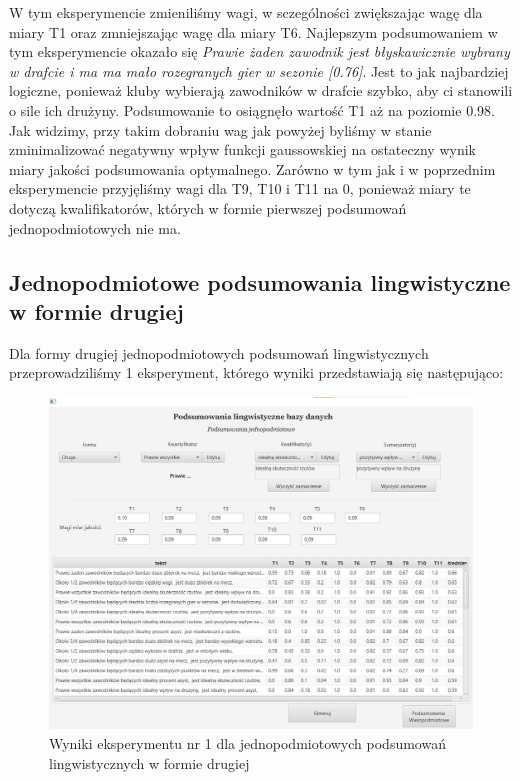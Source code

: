 \documentclass{classrep}
\begin{document}
W tym eksperymencie zmieniliśmy wagi, w sczególności zwiększając wagę dla miary T1 oraz zmniejszając wagę dla miary T6. Najlepszym podsumowaniem w tym eksperymencie okazało się \textit{Prawie żaden zawodnik jest błyskawicznie wybrany w drafcie i ma ma mało rozegranych gier w sezonie [0.76]}. Jest to jak najbardziej logiczne, ponieważ kluby wybierają zawodników w drafcie szybko, aby ci stanowili o sile ich drużyny. Podsumowanie to osiągnęło wartość T1 aż na poziomie 0.98. Jak widzimy, przy takim dobraniu wag jak powyżej byliśmy w stanie zminimalizować negatywny wpływ funkcji gaussowskiej na ostateczny wynik miary jakości podsumowania optymalnego. Zarówno w tym jak i w poprzednim eksperymencie przyjęliśmy wagi dla T9, T10 i T11 na 0, ponieważ miary te dotyczą kwalifikatorów, których w formie pierwszej podsumowań jednopodmiotowych nie ma.
\subsection{Jednopodmiotowe podsumowania lingwistyczne w formie drugiej}

Dla formy drugiej jednopodmiotowych podsumowań lingwistycznych przeprowadziliśmy 1 eksperyment, którego wyniki przedstawiają się następująco:
\begin{figure}[H]
    \centering
    \includegraphics[width = 14cm]{eksperyment3.png}
    \caption{Wyniki eksperymentu nr 1 dla jednopodmiotowych podsumowań lingwistycznych w formie drugiej}
    \label{rysunek:forma_druga_eksperyment_1}
\end{figure}
\end{document}
